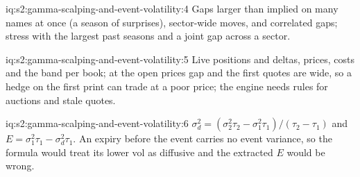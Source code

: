 \begin{solution}{iq:s2:gamma-scalping-and-event-volatility:4}
Gaps larger than implied on many names at once (a season of surprises), sector-wide moves, and correlated gaps; stress with the largest past seasons
and a joint gap across a sector.
\end{solution}

\begin{solution}{iq:s2:gamma-scalping-and-event-volatility:5}
Live positions and deltas, prices, costs and the band per book; at the open prices gap and the first quotes are wide, so a hedge on the first print can
trade at a poor price; the engine needs rules for auctions and stale quotes.
\end{solution}

\begin{solution}{iq:s2:gamma-scalping-and-event-volatility:6}
$\sigma_d^2 = (\sigma_2^2\tau_2 - \sigma_1^2\tau_1)/(\tau_2 - \tau_1)$ and $E = \sigma_1^2\tau_1 - \sigma_d^2\tau_1$. An expiry before the event
carries no event variance, so the formula would treat its lower vol as diffusive and the extracted $E$ would be wrong.
\end{solution}
